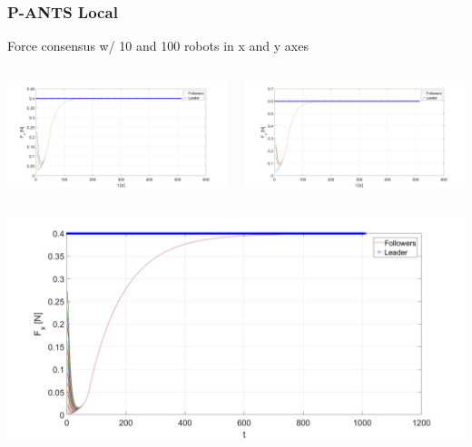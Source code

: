 \documentclass{beamer}
\begin{document}
\begin{frame}
\frametitle{P-ANTS Local}

Force consensus w/ 10 and 100 robots in x and y axes

\begin{columns}[c] 
\centering
 \includegraphics[width=1\textwidth]{figures/P_ANTS_Local_Fx.png}

\centering
 \includegraphics[width=1\textwidth]{figures/P_ANTS_Local_Fy.png}
\end{columns}

\begin{columns}[c] 
\centering
 \includegraphics[width=1\textwidth]{figures/P_ANTS_Local_Fx_100.png}


\end{columns}
\end{frame}
\end{document}
